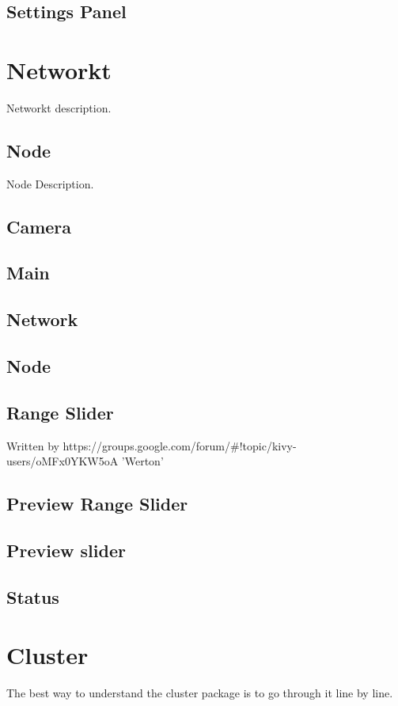 \subsection{Settings Panel}


\section{Networkt}
Networkt description.
\subsection{Node}
Node Description.
\subsection{Camera}
\subsection{Main}
\subsection{Network}
\subsection{Node}
\subsection{Range Slider}
Written by https://groups.google.com/forum/#!topic/kivy-users/oMFx0YKW5oA 'Werton'
\subsection{Preview Range Slider}
\subsection{Preview slider}
\subsection{Status}


\section{Cluster}
The best way to understand the cluster package is to go through it line by line.

